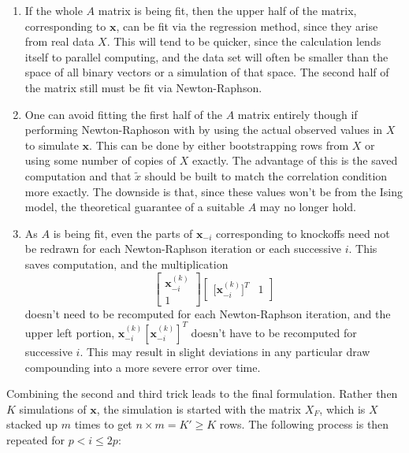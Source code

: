 \documentclass[11pt]{article}
\theoremstyle{definition}
\begin{document}
        \begin{enumerate}
            \item If the whole $A$ matrix is being fit, then the upper half of the matrix, corresponding to $\mathbf x$, can be fit via the regression method, since they arise from real data $X$. This will tend to be quicker, since the calculation lends itself to parallel computing, and the data set will often be smaller than the space of all binary vectors or a simulation of that space. The second half of the matrix still must be fit via Newton-Raphson.
            \item One can avoid fitting the first half of the $A$ matrix entirely though if performing Newton-Raphoson with by using the actual observed values in $X$ to simulate $\mathbf x$. This can be done by either bootstrapping rows from $X$ or using some number of copies of $X$ exactly. The advantage of this is the saved computation and that $\tilde x$ should be built to match the correlation condition more exactly. The downside is that, since these values won't be from the Ising model, the theoretical guarantee of a suitable $A$ may no longer hold.
            \item As $A$ is being fit, even the parts of $\mathbf x_{-i}$ corresponding to knockoffs need not be  redrawn for each Newton-Raphson iteration or each successive $i$. This saves computation, and the multiplication
            \[ \left[\begin{array}{c} \mathbf x_{-i}^{(k)} \\ 1 \end{array}\right]\left[\begin{array}{cc} \mathbf [\mathbf x_{-i}^{(k)}]^T & 1 \end{array}\right] \]
                doesn't need to be recomputed for each Newton-Raphson iteration, and the upper left portion, $\mathbf x_{-i}^{(k)}[\mathbf{x}_{-i}^{(k)}]^T$ doesn't have to be recomputed for successive $i$. This may result in slight deviations in any particular draw compounding into a more severe error over time.
        \end{enumerate}
        Combining the second and third trick leads to the final formulation. Rather then $K$ simulations of $\mathbf x$, the simulation is started with the matrix $X_F$, which is $X$ stacked up $m$ times to get $n\times m=K'\geq K$ rows. The following process is then repeated for $p<i\leq 2p$:
        
\end{document}
